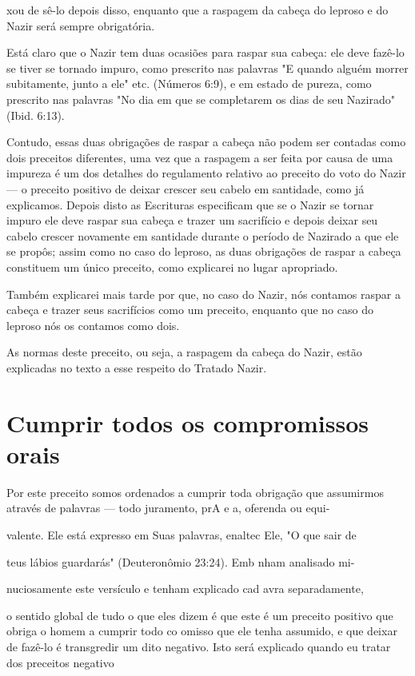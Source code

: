 \begin{itemize}
\begin{enumrate}
\begin{itemize}
\begin{itemize}
xou de sê-lo depois disso, enquanto que a raspagem da cabeça do leproso
e do Nazir será sempre obrigatória.

Está claro que o Nazir tem duas ocasiões para raspar sua cabeça: ele
deve fazê-lo se tiver se tornado impuro, como prescrito nas palavras "E
quan­do alguém morrer subitamente, junto a ele" etc. (Números 6:9), e em
estado de pureza, como prescrito nas palavras "No dia em que se
completarem os dias de seu Nazirado" (Ibid. 6:13).

Contudo, essas duas obrigações de raspar a cabeça não podem ser contadas
como dois preceitos diferentes, uma vez que a raspagem a ser feita por
causa de uma impureza é um dos detalhes do regulamento relativo ao
pre­ceito do voto do Nazir --- o preceito positivo de deixar crescer seu
cabelo em santidade, como já explicamos. Depois disto as Escrituras
especificam que se o Nazir se tornar impuro ele deve raspar sua cabeça e
trazer um sacrifício e de­pois deixar seu cabelo crescer novamente em
santidade durante o período de Nazirado a que ele se propôs; assim como
no caso do leproso, as duas obriga­ções de raspar a cabeça constituem um
único preceito, como explicarei no lu­gar apropriado.

Também explicarei mais tarde por que, no caso do Nazir, nós conta­mos
raspar a cabeça e trazer seus sacrifícios como um preceito, enquanto que
no caso do leproso nós os contamos como dois.

As normas deste preceito, ou seja, a raspagem da cabeça do Nazir, estão
explicadas no texto a esse respeito do Tratado Nazir.

\section{Cumprir todos os compromissos orais}

Por este preceito somos ordenados a cumprir toda obrigação que
assumirmos através de palavras --- todo juramento, prA e a, oferenda ou
equi-

valente. Ele está expresso em Suas palavras, enaltec Ele, "O que sair de

teus lábios guardarás" (Deuteronômio 23:24). Emb nham analisado mi-

nuciosamente este versículo e tenham explicado cad avra separadamente,

o sentido global de tudo o que eles dizem é que este é um preceito
positivo que obriga o homem a cumprir todo co omisso que ele tenha
assumido, e que deixar de fazê-lo é transgredir um dito negativo. Isto
será explicado quando eu tratar dos preceitos negativo


\end{itemize}
\end{itemize}
\end{enumrate}
\end{itemize}
